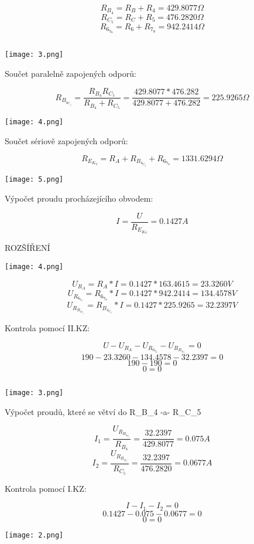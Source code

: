 \documentclass[11pt]{article}
\begin{document}
$$R_B_4=R_B+R_4=429.8077\Omega$$
$$R_C_5=R_C+R_5=476.2820\Omega$$
$$R_6_7_8=R_6+R_7_8=942.2414\Omega$$

$$$$
\begin{center}
\texttt{[image: 3.png]}
\end{center}
Součet paralelně zapojených odporů:

$$R_B_4_C_5=\frac{R_B_4R_C_5}{R_B_4+R_C_5}=\frac{429.8077*476.282}{429.8077+476.282}=225.9265\Omega$$


\begin{center}
\texttt{[image: 4.png]}
\end{center}
Součet sériově zapojených odporů:

$$R_E_K_V=R_A+R_B_4_C_5+R_6_7_8=1331.6294\Omega$$
\begin{center}
\texttt{[image: 5.png]}
\end{center}
Výpočet proudu procházejícího obvodem:

$$I=\frac{U}{R_E_K_V}=0.1427A$$



\begin{center}
{\Large \color{red} ROZŠÍŘENÍ \par}
\end{center}

\begin{center}
\texttt{[image: 4.png]}
\end{center}
$$U_R_A=R_A*I=0.1427*163.4615=23.3260V$$
$$U_R_6_7_8=R_6_7_8*I=0.1427*942.2414=134.4578V$$
$$U_R_B_4_C_5=R_B_4_C_5*I=0.1427*225.9265=32.2397V$$

Kontrola pomocí II.KZ:

$$U-U_R_A-U_R_6_7_8-U_R_B_4_C_5=0$$
$$190-23.3260-134.4578-32.2397=0$$
$$190-190=0$$
$$0=0$$


$$$$
\begin{center}
\texttt{[image: 3.png]}
\end{center}
$$$$
Výpočet proudů, které se větví do R_B_4  -a-  R_C_5

$$I_1=\frac{U_R_B_4_C_5}{R_B_4}=\frac{32.2397}{429.8077}=0.075A$$
$$I_2=\frac{U_R_B_4_C_5}{R_C_5}=\frac{32.2397}{476.2820}=0.0677A$$$$$$

Kontrola pomocí I.KZ:

$$I-I_1-I_2=0$$
$$0.1427-0.075-0.0677=0$$
$$0=0$$


\begin{center}
\texttt{[image: 2.png]}
\end{center}
\end{document}
